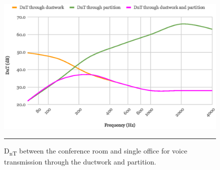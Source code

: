 \begin{figure}[htbp]
	\centering
	\includegraphics[width=\textwidth]{figures/DnT.eps}
	\rule{\textwidth}{0.5pt} %
	\caption{D\textsubscript{nT} between the conference room and single office for voice transmission through the ductwork and partition.}
	\label{fig:DnT}
\end{figure}